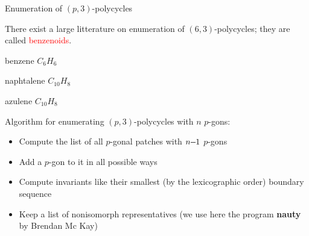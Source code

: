 \documentclass[%
pdf,
colorBG,
slideColor,
]{prosper}
\begin{document}
\begin{slide}{Enumeration of $(p,3)$-polycycles}

\vspace{-2mm}
There exist a large litterature on enumeration of $(6,3)$-polycycles; they are called \textcolor{red}{benzenoids}.
\begin{center}
\begin{minipage}[t]{3.5cm}
\centering
\epsfxsize=9mm
\par
benzene $C_6H_6$
\end{minipage}
\begin{minipage}[t]{3.5cm}
\centering
\epsfxsize=15mm
\par
naphtalene $C_{10}H_8$
\end{minipage}
\begin{minipage}[t]{3.5cm}
\centering
\epsfxsize=15mm
\par
azulene $C_{10}H_8$
\end{minipage}

\end{center}

Algorithm for enumerating $(p,3)$-polycycles with $n$ $p$-gons:
\begin{itemize}
\item Compute the list of all $p$-gonal patches with $n\hspace{-1mm}-\hspace{-1mm}1$ $p$-gons
\item Add a $p$-gon to it in all possible ways
\item Compute invariants like their smallest (by the lexicographic order) boundary sequence
\item Keep a list of nonisomorph representatives (we use here the program {\bf nauty} by Brendan Mc Kay)
\end{itemize}
\end{slide}
\end{document}
